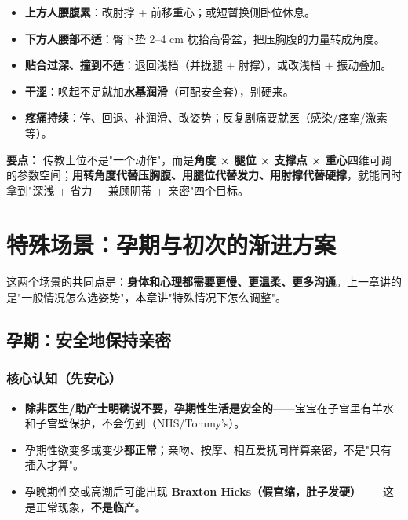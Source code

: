 \documentclass[12pt,UTF8,openany]{ctexbook}
\begin{document}
\begin{itemize}[leftmargin=2em,itemsep=0.3em]
  \item \textbf{上方人腰腹累}：改肘撑 + 前移重心；或短暂换侧卧位休息。
  \item \textbf{下方人腰部不适}：臀下垫 2–4 cm 枕抬高骨盆，把压胸腹的力量转成角度。
  \item \textbf{贴合过深、撞到不适}：退回浅档（并拢腿 + 肘撑），或改浅档 + 振动叠加。
  \item \textbf{干涩}：唤起不足就加\textbf{水基润滑}（可配安全套），别硬来。
  \item \textbf{疼痛持续}：停、回退、补润滑、改姿势；反复剧痛要就医（感染/痉挛/激素等）。
\end{itemize}

\vspace{1em}
\noindent\textbf{要点：} 传教士位不是"一个动作"，而是\textbf{角度 × 腿位 × 支撑点 × 重心}四维可调的参数空间；\textbf{用转角度代替压胸腹、用腿位代替发力、用肘撑代替硬撑}，就能同时拿到"深浅 + 省力 + 兼顾阴蒂 + 亲密"四个目标。

\chapter{特殊场景：孕期与初次的渐进方案}

这两个场景的共同点是：\textbf{身体和心理都需要更慢、更温柔、更多沟通}。上一章讲的是"一般情况怎么选姿势"，本章讲"特殊情况下怎么调整"。

\section{孕期：安全地保持亲密}

\subsection{核心认知（先安心）}

\begin{itemize}[leftmargin=2em,itemsep=0.3em]
  \item \textbf{除非医生/助产士明确说不要，孕期性生活是安全的}——宝宝在子宫里有羊水和子宫壁保护，不会伤到（NHS/Tommy's）。
  \item 孕期性欲变多或变少\textbf{都正常}；亲吻、按摩、相互爱抚同样算亲密，不是"只有插入才算"。
  \item 孕晚期性交或高潮后可能出现 \textbf{Braxton Hicks（假宫缩，肚子发硬）}——这是正常现象，\textbf{不是临产}。
\end{itemize}
\end{document}
